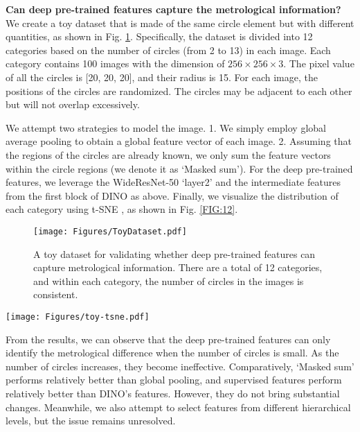 \documentclass[final,5p,times,twocolumn]{elsarticle}
\begin{document}
\textbf{Can deep pre-trained features capture the metrological information?} We create a toy dataset that is made of the same circle element but with different quantities, as shown in Fig. \ref{FIG:11}. Specifically, the dataset is divided into 12 categories based on the number of circles (from 2 to 13) in each image. Each category contains 100 images with the dimension of $256 \times 256 \times 3$. The pixel value of all the circles is [20, 20, 20], and their radius is 15. For each image, the positions of the circles are randomized. The circles may be adjacent to each other but will not overlap excessively.      

We attempt two strategies to model the image. 1. We simply employ global average pooling to obtain a global feature vector of each image. 2. Assuming that the regions of the circles are already known, we only sum the feature vectors within the circle regions (we denote it as `Masked sum'). For the deep pre-trained features, we leverage the WideResNet-50 `layer2' and the intermediate features from the first block of DINO as above. Finally, we visualize the distribution of each category using t-SNE \cite{van2008visualizing}, as shown in Fig. \ref{FIG:12}.
\begin{figure}
\centering
		\texttt{[image: Figures/ToyDataset.pdf]}\caption{A toy dataset for validating whether deep pre-trained features can capture metrological information. 
There are a total of 12 categories, and within each category, the number of circles in the images is consistent.}
	\label{FIG:11}
\end{figure}

\begin{figure*}
\centering
		\texttt{[image: Figures/toy-tsne.pdf]}\caption{
Visualization of the image distributions in our toy dataset under different pre-trained features and feature extraction strategies.}
	\label{FIG:12}
\end{figure*}


From the results, we can observe that the deep pre-trained features can only identify the metrological difference when the number of circles is small. As the number of circles increases, they become ineffective. Comparatively, `Masked sum' performs relatively better than global pooling, and supervised features perform relatively better than DINO's features. However, they do not bring substantial changes. Meanwhile, we also attempt to select features from different hierarchical levels, but the issue remains unresolved. 
\end{document}
